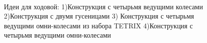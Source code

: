 \begin{enumerate}
\begin{enumerate}
\begin{enumerate}
\begin{enumerate}
	      \begin{figure}[H]
	      	\begin{minipage}[h]{0.2\linewidth}
	      		\center  
	      	\end{minipage}
	      	\begin{minipage}[h]{0.6\linewidth}
	          \caption{Идеи для ходовой: 1)Конструкция с четырьмя ведущими колесами 2)Конструкция с двумя гусеницами 3) Конструкция с четырьмя ведущими омни-колесами из набора TETRIX 4)Конструкция с четырьмя ведущими омни-колесами}
	        \end{minipage}
	      \end{figure}
	      

\end{enumerate}
\end{enumerate}
\end{enumerate}
\end{enumerate}
